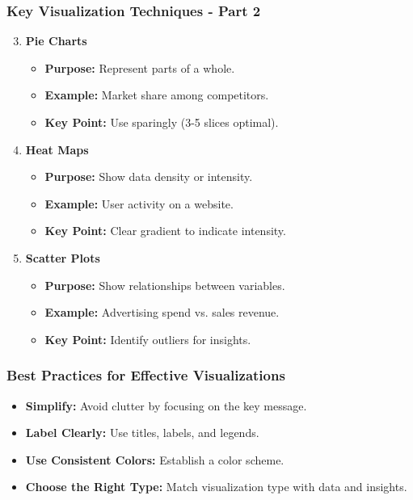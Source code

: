 \documentclass[aspectratio=169]{beamer}
\begin{document}
\begin{frame}[fragile]
    \frametitle{Key Visualization Techniques - Part 2}
    \begin{enumerate}
        \setcounter{enumi}{2}
        \item \textbf{Pie Charts}
            \begin{itemize}
                \item \textbf{Purpose:} Represent parts of a whole.
                \item \textbf{Example:} Market share among competitors.
                \item \textbf{Key Point:} Use sparingly (3-5 slices optimal).
            \end{itemize}
        \item \textbf{Heat Maps}
            \begin{itemize}
                \item \textbf{Purpose:} Show data density or intensity.
                \item \textbf{Example:} User activity on a website.
                \item \textbf{Key Point:} Clear gradient to indicate intensity.
            \end{itemize}
        \item \textbf{Scatter Plots}
            \begin{itemize}
                \item \textbf{Purpose:} Show relationships between variables.
                \item \textbf{Example:} Advertising spend vs. sales revenue.
                \item \textbf{Key Point:} Identify outliers for insights.
            \end{itemize}
    \end{enumerate}
\end{frame}

\begin{frame}[fragile]
    \frametitle{Best Practices for Effective Visualizations}
    \begin{itemize}
        \item \textbf{Simplify:} Avoid clutter by focusing on the key message.
        \item \textbf{Label Clearly:} Use titles, labels, and legends.
        \item \textbf{Use Consistent Colors:} Establish a color scheme.
        \item \textbf{Choose the Right Type:} Match visualization type with data and insights.
    \end{itemize}
\end{frame}
\end{document}
